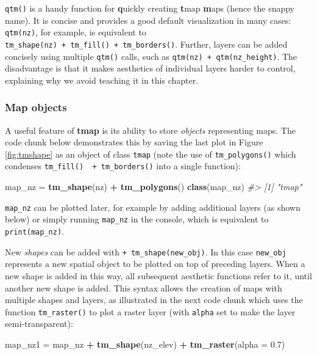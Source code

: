 \documentclass[]{krantz}
\newenvironment{Shaded}{\begin{snugshade}}{\end{snugshade}}
\newcommand{\CommentTok}[1]{\textcolor[rgb]{0.37,0.37,0.37}{\textit{#1}}}
\newcommand{\DataTypeTok}[1]{\textcolor[rgb]{0.27,0.27,0.27}{#1}}
\newcommand{\FloatTok}[1]{\textcolor[rgb]{0.06,0.06,0.06}{#1}}
\newcommand{\KeywordTok}[1]{\textcolor[rgb]{0.27,0.27,0.27}{\textbf{#1}}}
\newcommand{\NormalTok}[1]{#1}
\newcommand{\OperatorTok}[1]{\textcolor[rgb]{0.43,0.43,0.43}{\textbf{#1}}}
\newcommand{\StringTok}[1]{\textcolor[rgb]{0.5,0.5,0.5}{#1}}
\let\BeginKnitrBlock\begin \let\EndKnitrBlock\end
\begin{document}
\BeginKnitrBlock{rmdnote}
\texttt{qtm()} is a handy function for \textbf{q}uickly creating \textbf{t}map \textbf{m}aps (hence the snappy name).
It is concise and provides a good default visualization in many cases:
\texttt{qtm(nz)}, for example, is equivalent to \texttt{tm\_shape(nz)\ +\ tm\_fill()\ +\ tm\_borders()}.
Further, layers can be added concisely using multiple \texttt{qtm()} calls, such as \texttt{qtm(nz)\ +\ qtm(nz\_height)}.
The disadvantage is that it makes aesthetics of individual layers harder to control, explaining why we avoid teaching it in this chapter.
\EndKnitrBlock{rmdnote}

\hypertarget{map-obj}{%
\subsubsection{Map objects}\label{map-obj}}

A useful feature of \textbf{tmap} is its ability to store \emph{objects} representing maps.
The code chunk below demonstrates this by saving the last plot in Figure \ref{fig:tmshape} as an object of class \texttt{tmap} (note the use of \texttt{tm\_polygons()} which condenses \texttt{tm\_fill()\ \ +\ tm\_borders()} into a single function):

\begin{Shaded}
\begin{Highlighting}[]
\NormalTok{map_nz =}\StringTok{ }\KeywordTok{tm_shape}\NormalTok{(nz) }\OperatorTok{+}\StringTok{ }\KeywordTok{tm_polygons}\NormalTok{()}
\KeywordTok{class}\NormalTok{(map_nz)}
\CommentTok{#> [1] "tmap"}
\end{Highlighting}
\end{Shaded}

\texttt{map\_nz} can be plotted later, for example by adding additional layers (as shown below) or simply running \texttt{map\_nz} in the console, which is equivalent to \texttt{print(map\_nz)}.

New \emph{shapes} can be added with \texttt{+\ tm\_shape(new\_obj)}.
In this case \texttt{new\_obj} represents a new spatial object to be plotted on top of preceding layers.
When a new shape is added in this way, all subsequent aesthetic functions refer to it, until another new shape is added.
This syntax allows the creation of maps with multiple shapes and layers, as illustrated in the next code chunk which uses the function \texttt{tm\_raster()} to plot a raster layer (with \texttt{alpha} set to make the layer semi-transparent):

\begin{Shaded}
\begin{Highlighting}[]
\NormalTok{map_nz1 =}\StringTok{ }\NormalTok{map_nz }\OperatorTok{+}
\StringTok{  }\KeywordTok{tm_shape}\NormalTok{(nz_elev) }\OperatorTok{+}\StringTok{ }\KeywordTok{tm_raster}\NormalTok{(}\DataTypeTok{alpha =} \FloatTok{0.7}\NormalTok{)}
\end{Highlighting}
\end{Shaded}
\end{document}
